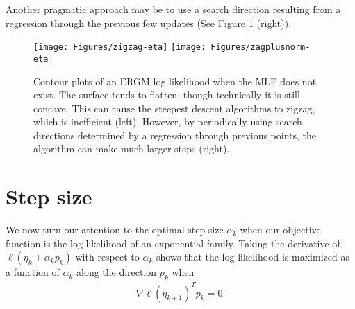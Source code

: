 Another pragmatic approach may be to use a search direction resulting from a regression
through the previous few updates (See Figure \ref{F:zigzag} (right)).


\begin{figure}[!ht]
\centering
\texttt{[image: Figures/zigzag-eta]}
\texttt{[image: Figures/zagplusnorm-eta]}
\caption[Contour plots of an ERGM log likelihood when the MLE does not exist]{Contour plots of an ERGM log likelihood when the MLE does not exist.  The surface 
tends to flatten, though technically it is still concave.  This can cause 
the steepest descent 
algorithms to zigzag, which is inefficient (left).  However, by periodically using 
search directions 
determined by 
a regression through 
previous points, the algorithm can make much larger steps (right).}
\label{F:zigzag}
\end{figure}


\section{Step size}
We now turn our attention to the optimal step size $\alpha_k$ when our objective 
function is the log likelihood of an 
exponential family.  Taking the derivative of $\ell( \eta_k + \alpha_k p_k)$ with 
respect to $\alpha_k$ shows that the 
log likelihood is maximized as a function of $\alpha_k$ along the direction $p_k$  
when 
\begin{align*}
	\nabla \ell( \eta_{k+1} )^T p_k = 0.
\end{align*}


